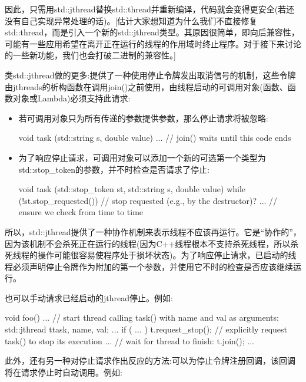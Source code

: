 因此，只需用std::jthread替换std::thread并重新编译，代码就会变得更安全(若还没有自己实现异常处理的话)。[估计大家想知道为什么我们不直接修复std::thread，而是引入一个新的std::jthread类型。其原因很简单，即向后兼容性，可能有一些应用希望在离开正在运行的线程的作用域时终止程序。对于接下来讨论的一些新功能，我们也会打破二进制的兼容性。]


类std::jthread做的更多:提供了一种使用停止令牌发出取消信号的机制，这些令牌由jthreads的析构函数在调用join()之前使用，由线程启动的可调用对象(函数、函数对象或Lambda)必须支持此请求:

\begin{itemize}
\item 
若可调用对象只为所有传递的参数提供参数，那么停止请求将被忽略:

\begin{cpp}
void task (std::string s, double value)
{
	... // join() waits until this code ends
}
\end{cpp}

\item 
为了响应停止请求，可调用对象可以添加一个新的可选第一个类型为std::stop\_token的参数，并不时检查是否请求了停止:

\begin{cpp}
void task (std::stop_token st,
std::string s, double value)
{
	while (!st.stop_requested()) { // stop requested (e.g., by the destructor)?
		... // ensure we check from time to time
	}
}
\end{cpp}
\end{itemize}

所以，std::jthread提供了一种协作机制来表示线程不应该再运行。它是“协作的”，因为该机制不会杀死正在运行的线程(因为C++线程根本不支持杀死线程，所以杀死线程的操作可能很容易使程序处于损坏状态)。为了响应停止请求，已启动的线程必须声明停止令牌作为附加的第一个参数，并使用它不时的检查是否应该继续运行。

也可以手动请求已经启动的jthread停止。例如:

\begin{cpp}
void foo()
{
	...
	// start thread calling task() with name and val as arguments:
	std::jthread t{task, name, val};
	...
	if ( ... ) {
		t.request_stop(); // explicitly request task() to stop its execution
	}
	...
	// wait for thread to finish:
	t.join();
	...
}
\end{cpp}

此外，还有另一种对停止请求作出反应的方法:可以为停止令牌注册回调，该回调将在请求停止时自动调用。例如:

